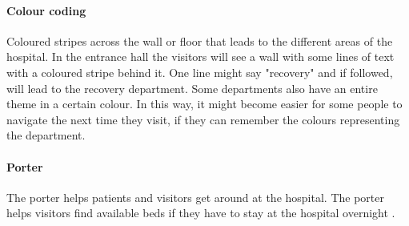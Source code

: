 \paragraph{Colour coding}
Coloured stripes across the wall or floor that leads to the different areas of the hospital. In the entrance hall the visitors will see a wall with some lines of text with a coloured stripe behind it. One line might say "recovery" and if followed, will lead to the recovery department. Some departments also have an entire theme in a certain colour. In this way, it might become easier for some people to navigate the next time they visit, if they can remember the colours representing the department. 

\paragraph{Porter}
The porter helps patients and visitors get around at the hospital. The porter helps visitors find available beds if they have to stay at the hospital overnight \cite{ugd_port}. 

